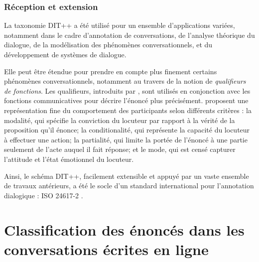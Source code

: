 \documentclass[10pt,a4paper,twoside]{article}
\begin{document}
\subsubsection{Réception et extension}

La taxonomie DIT++ a été utilisé pour un ensemble d'applications variées, notamment dans le cadre d'annotation de conversations, de l'analyse théorique du dialogue, de la modélisation des phénomènes conversationnels, et du développement de systèmes de dialogue. 

Elle peut être étendue pour prendre en compte plus finement certains phénomènes conversationnels, notamment au travers de la notion de \textit{qualifieurs de fonctions}. Les qualifieurs, introduits par \citet{petukhova2010introducing}, sont utilisés en conjonction avec les fonctions communicatives pour décrire l'énoncé plus précisément. \citeauthor{petukhova2010introducing} proposent une représentation fine du comportement des participants selon différents critères : la modalité, qui spécifie la conviction du locuteur par rapport à la vérité de la proposition qu'il énonce; la conditionalité, qui représente la capacité du locuteur à effectuer une action; la partialité, qui limite la portée de l'énoncé à une partie seulement de l'acte auquel il fait réponse; et le mode, qui est censé capturer l'attitude et l'état émotionnel du locuteur.

Ainsi, le schéma DIT++, facilement extensible et appuyé par un vaste ensemble de travaux antérieurs, a été le socle d'un standard international pour l'annotation dialogique : ISO 24617-2 \cite{bunt2012iso}.

\section{Classification des énoncés dans les conversations écrites en ligne }
\label{sec:online_written_conversation_analysis}
\end{document}

